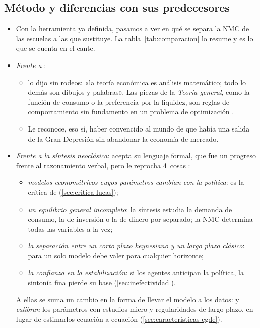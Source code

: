 \documentclass[11pt]{article}
\begin{document}
\subsection{Método y diferencias con sus predecesores}\label{sec:metodo}

\begin{itemize}
\item Con la herramienta ya definida, pasamos a ver en qué se separa la NMC de las escuelas a las que sustituye. La tabla~\ref{tab:comparacion} lo resume y es lo que se cuenta en el cante.
\item \emph{Frente a }:
  \begin{itemize}
  \item {} lo dijo sin rodeos: «la teoría económica es análisis matemático; todo lo demás son dibujos y palabras»\nocite{Lucas2001Memoir}. Las piezas de la \emph{Teoría general}, como la función de consumo o la preferencia por la liquidez, son reglas de comportamiento sin fundamento en un problema de optimización .
  \item Le reconoce, eso sí, haber convencido al mundo de que había una salida de la Gran Depresión sin abandonar la economía de mercado.
  \end{itemize}
\item \emph{Frente a la síntesis neoclásica}: acepta su lenguaje formal, que fue un progreso frente al razonamiento verbal, pero le reprocha 4~cosas :
  \begin{itemize}
  \item \emph{modelos econométricos cuyos parámetros cambian con la política}: es la crítica de  (\ref{sec:critica-lucas});
  \item \emph{un equilibrio general incompleto}: la síntesis estudia la demanda de consumo, la de inversión o la de dinero por separado; la NMC determina todas las variables a la vez;
  \item \emph{la separación entre un corto plazo keynesiano y un largo plazo clásico}: para  un solo modelo debe valer para cualquier horizonte;
  \item \emph{la confianza en la estabilización}: si los agentes anticipan la política, la sintonía fina pierde su base (\ref{sec:inefectividad}).
  \end{itemize}
  A ellas se suma un cambio en la forma de llevar el modelo a los datos:  y  \emph{calibran} los parámetros con estudios micro y regularidades de largo plazo, en lugar de estimarlos ecuación a ecuación (\ref{sec:caracteristicas-egde}).

\end{itemize}
\end{document}
